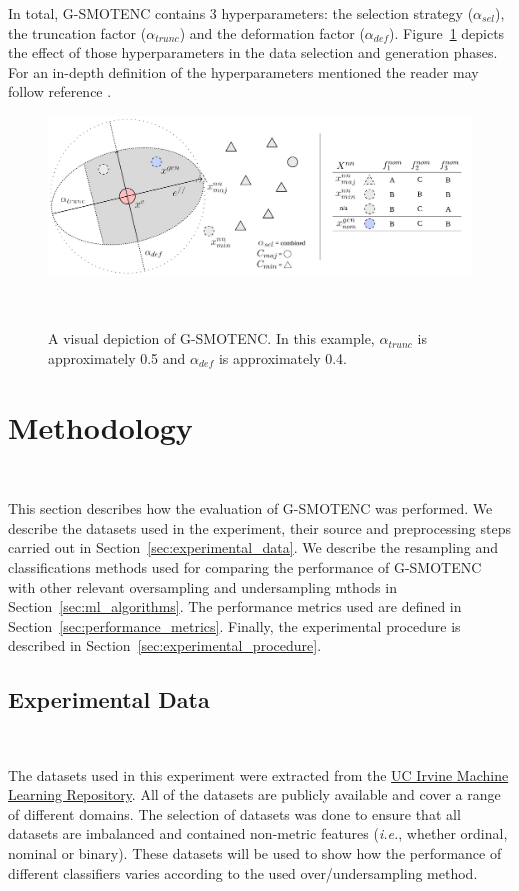 \documentclass[parskip=full]{scrartcl}
\begin{document}
In total, G-SMOTENC contains 3 hyperparameters: the selection strategy
($\alpha_{sel}$), the truncation factor ($\alpha_{trunc}$) and the deformation
factor ($\alpha_{def}$). Figure~\ref{fig:gsmote} depicts the effect of those
hyperparameters in the data selection and generation phases. For an in-depth
definition of the hyperparameters mentioned the reader may follow reference
\cite{douzas2019geometric}.

\begin{figure}
	\centering
	\includegraphics[width=\linewidth]{../analysis/g-smote}
    \caption{A visual depiction of G-SMOTENC. In this example,
        $\alpha_{trunc}$ is approximately 0.5 and $\alpha_{def}$ is
        approximately 0.4.
    }~\label{fig:gsmote}
\end{figure}

\section{Methodology}~\label{sec:methodology}

This section describes how the evaluation of G-SMOTENC was performed. We
describe the datasets used in the experiment, their source and preprocessing
steps carried out in Section~\ref{sec:experimental_data}. We describe the
resampling and classifications methods used for comparing the performance of
G-SMOTENC with other relevant oversampling and undersampling mthods in
Section~\ref{sec:ml_algorithms}. The performance metrics used are defined in
Section~\ref{sec:performance_metrics}. Finally, the experimental procedure is
described in Section~\ref{sec:experimental_procedure}.

\subsection{Experimental Data}~\label{sec:experimental_data}

The datasets used in this experiment were extracted from the
\href{https://archive.ics.uci.edu}{UC Irvine Machine Learning Repository}. All
of the datasets are publicly available and cover a range of different domains.
The selection of datasets was done to ensure that all datasets are imbalanced
and contained non-metric features (\textit{i.e.}, whether ordinal, nominal or
binary). These datasets will be used to show how the performance of different
classifiers varies according to the used over/undersampling method.
\end{document}
